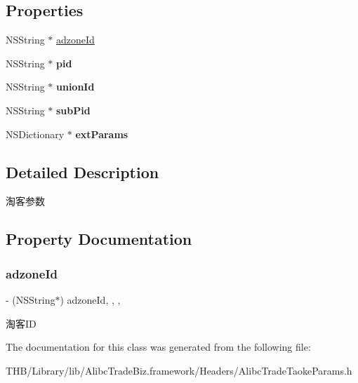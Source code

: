 \subsection*{Properties}
\begin{DoxyCompactItemize}
\item 
N\+S\+String $\ast$ \mbox{\hyperlink{interface_alibc_trade_taoke_params_a0ac46b91efd17d272a0555d201a1b8d4}{adzone\+Id}}
\item 
\mbox{\label{interface_alibc_trade_taoke_params_acfc52cb2987799461372b0ee0e0e7c8d}} 
N\+S\+String $\ast$ {\bfseries pid}
\item 
\mbox{\label{interface_alibc_trade_taoke_params_adaba4e7954b8262729d7cb51f8ecc712}} 
N\+S\+String $\ast$ {\bfseries union\+Id}
\item 
\mbox{\label{interface_alibc_trade_taoke_params_ae6482a68b60263079da776fff41c247c}} 
N\+S\+String $\ast$ {\bfseries sub\+Pid}
\item 
\mbox{\label{interface_alibc_trade_taoke_params_af6e9c67237aa4a92f39f1410cf8be15a}} 
N\+S\+Dictionary $\ast$ {\bfseries ext\+Params}
\end{DoxyCompactItemize}


\subsection{Detailed Description}
淘客参数 

\subsection{Property Documentation}
\mbox{\label{interface_alibc_trade_taoke_params_a0ac46b91efd17d272a0555d201a1b8d4}} 
\subsubsection{\texorpdfstring{adzone\+Id}{adzoneId}}
{\footnotesize\ttfamily -\/ (N\+S\+String$\ast$) adzone\+Id\hspace{0.3cm}{\ttfamily [read]}, {\ttfamily [write]}, {\ttfamily [nonatomic]}, {\ttfamily [copy]}}

淘客\+ID 

The documentation for this class was generated from the following file\+:\begin{DoxyCompactItemize}
\item 
T\+H\+B/\+Library/lib/\+Alibc\+Trade\+Biz.\+framework/\+Headers/Alibc\+Trade\+Taoke\+Params.\+h\end{DoxyCompactItemize}
